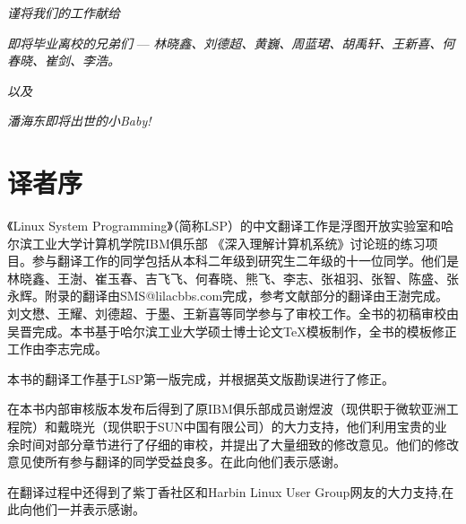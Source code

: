 \vspace*{16ex}
\begin{center}
	\textit{\huge 谨将我们的工作献给}
\end{center}

\begin{center}
	\textit{\Large 即将毕业离校的兄弟们} --- \textit{\Large 林晓鑫、刘德超、黄巍、周蓝珺、胡禹轩、王新喜、何春晓、崔剑、李浩。}
\end{center}

\begin{center}
	\textit{\large 以及}
\end{center}

\begin{center}
	\textit{\Large 潘海东即将出世的小Baby!}
\end{center}

\newpage
\chapter{译者序}
《Linux System Programming》（简称LSP）的中文翻译工作是浮图开放实验室和哈尔滨工业大学计算机学院IBM俱乐部 《深入理解计算机系统》讨论班的练习项目。参与翻译工作的同学包括从本科二年级到研究生二年级的十一位同学。他们是林晓鑫、王澍、崔玉春、吉飞飞、何春晓、熊飞、李志、张祖羽、张智、陈盛、张永辉。附录的翻译由SMS@lilacbbs.com完成，参考文献部分的翻译由王澍完成。刘文懋、王耀、刘德超、于墨、王新喜等同学参与了审校工作。全书的初稿审校由吴晋完成。本书基于哈尔滨工业大学硕士博士论文TeX模板制作，全书的模板修正工作由李志完成。

本书的翻译工作基于LSP第一版完成，并根据英文版勘误进行了修正。

在本书内部审核版本发布后得到了原IBM俱乐部成员谢煜波（现供职于微软亚洲工程院）和戴晓光（现供职于SUN中国有限公司）的大力支持，他们利用宝贵的业余时间对部分章节进行了仔细的审校，并提出了大量细致的修改意见。他们的修改意见使所有参与翻译的同学受益良多。在此向他们表示感谢。

在翻译过程中还得到了紫丁香社区和Harbin Linux User Group网友的大力支持,在此向他们一并表示感谢。

